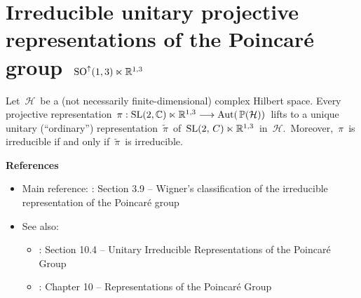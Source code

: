 
\vskip 1.0cm
\section{Irreducible unitary projective representations of the Poincaré group \,$\textnormal{SO}^{\uparrow}(1,3) \ltimes \mathbb{R}^{1,3}$}

\vskip 0.3cm
\begin{theorem}
\mbox{}
\vskip 0.1cm
\noindent
Let \,$\mathcal{H}$\, be a (not necessarily finite-dimensional) complex Hilbert space.
Every projective representation
\,$\pi : \textnormal{SL}(2,\mathbb{C}) \ltimes \mathbb{R}^{1,3} \longrightarrow \textnormal{Aut}\!\left(\,\mathbb{P}(\mathcal{H})\right)$\,
lifts to a unique unitary (``ordinary'') representation
\,$\widetilde{\pi}$\, of \,$\textnormal{SL}(2,\,C) \ltimes \mathbb{R}^{1,3}$\,
in \,$\mathcal{H}$.\,
Moreover, \,$\pi$\, is irreducible if and only if \,$\widetilde{\pi}$\, is irreducible.
\end{theorem}


\vskip 1.0cm
\noindent
\textbf{References}
\begin{itemize}
\item
	Main reference:
	\vskip 0.1cm
	\cite{Sternberg1994}: Section 3.9 -- Wigner's classification of the irreducible representation of the Poincaré group
\item
	See also:
	\begin{itemize}
	\item
		\cite{Tung1985}: Section 10.4 -- Unitary Irreducible Representations of the Poincaré Group
	\item
		\cite{Jones2020}: Chapter 10 -- Representations of the Poincaré Group
	\end{itemize}
\end{itemize}

